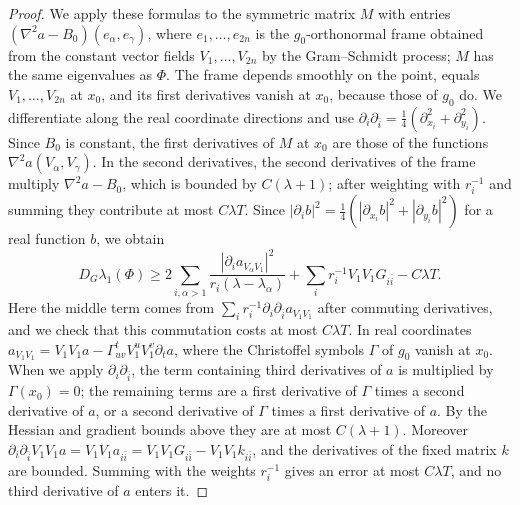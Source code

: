\begin{proof}
We apply these formulas to the symmetric matrix $M$ with entries $(\nabla^2a-B_0)(e_\alpha,e_\gamma)$, where $e_1,\ldots,e_{2n}$ is the $g_0$-orthonormal frame obtained from the constant vector fields $V_1,\ldots,V_{2n}$ by the Gram--Schmidt process; $M$ has the same eigenvalues as $\Phi$. The frame depends smoothly on the point, equals $V_1,\ldots,V_{2n}$ at $x_0$, and its first derivatives vanish at $x_0$, because those of $g_0$ do. We differentiate along the real coordinate directions and use $\partial_i\partial_{\bar i}=\frac14(\partial_{x_i}^2+\partial_{y_i}^2)$. Since $B_0$ is constant, the first derivatives of $M$ at $x_0$ are those of the functions $\nabla^2a(V_\alpha,V_\gamma)$. In the second derivatives, the second derivatives of the frame multiply $\nabla^2a-B_0$, which is bounded by $C(\lambda+1)$; after weighting with $r_i^{-1}$ and summing they contribute at most $C\lambda T$. Since $|\partial_ib|^2=\frac14(|\partial_{x_i}b|^2+|\partial_{y_i}b|^2)$ for a real function $b$, we obtain
\[
 D_G\lambda_1(\Phi)\geq
 2\sum_{i,\alpha>1}
       \frac{|\partial_i a_{V_\alpha V_1}|^2}
                           {r_i(\lambda-\lambda_\alpha)}
       +\sum_i r_i^{-1}V_1V_1G_{i\bar i}-C\lambda T.
\]
Here the middle term comes from $\sum_ir_i^{-1}\partial_i\partial_{\bar i}a_{V_1V_1}$ after commuting derivatives, and we check that this commutation costs at most $C\lambda T$. In real coordinates $a_{V_1V_1}=V_1V_1a-\Gamma^t_{uv}V_1^uV_1^v\partial_ta$, where the Christoffel symbols $\Gamma$ of $g_0$ vanish at $x_0$. When we apply $\partial_i\partial_{\bar i}$, the term containing third derivatives of $a$ is multiplied by $\Gamma(x_0)=0$; the remaining terms are a first derivative of $\Gamma$ times a second derivative of $a$, or a second derivative of $\Gamma$ times a first derivative of $a$. By the Hessian and gradient bounds above they are at most $C(\lambda+1)$. Moreover $\partial_i\partial_{\bar i}V_1V_1a=V_1V_1a_{i\bar i}=V_1V_1G_{i\bar i}-V_1V_1k_{i\bar i}$, and the derivatives of the fixed matrix $k$ are bounded. Summing with the weights $r_i^{-1}$ gives an error at most $C\lambda T$, and no third derivative of $a$ enters it.


\end{proof}
